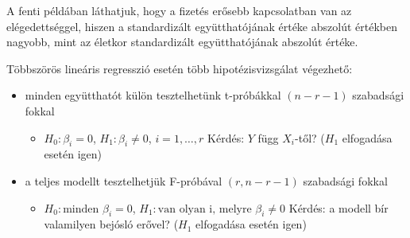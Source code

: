 \documentclass[
  letterpaper,
]{krantz}
\makeatletter
\newenvironment{Shaded}{\begin{snugshade}}{\end{snugshade}}
\newcommand{\AttributeTok}[1]{\textcolor[rgb]{0.40,0.45,0.13}{#1}}
\newcommand{\CommentTok}[1]{\textcolor[rgb]{0.37,0.37,0.37}{#1}}
\newcommand{\DecValTok}[1]{\textcolor[rgb]{0.68,0.00,0.00}{#1}}
\newcommand{\FunctionTok}[1]{\textcolor[rgb]{0.28,0.35,0.67}{#1}}
\newcommand{\NormalTok}[1]{\textcolor[rgb]{0.00,0.23,0.31}{#1}}
\newcommand{\SpecialCharTok}[1]{\textcolor[rgb]{0.37,0.37,0.37}{#1}}
\providecommand{\tightlist}{%
  \setlength{\itemsep}{0pt}\setlength{\parskip}{0pt}}\usepackage{longtable,booktabs,array}
\newenvironment{kframe}{%
\medskip{}
\setlength{\fboxsep}{.8em}
 \def\at@end@of@kframe{}%
 \ifinner\ifhmode%
  \def\at@end@of@kframe{\end{minipage}}%
  \begin{minipage}{\columnwidth}%
 \fi\fi%
 \def\FrameCommand##1{\hskip\@totalleftmargin \hskip-\fboxsep
 \colorbox{shadecolor}{##1}\hskip-\fboxsep
     \hskip-\linewidth \hskip-\@totalleftmargin \hskip\columnwidth}%
 \MakeFramed {\advance\hsize-\width
   \@totalleftmargin\z@ \linewidth\hsize
   \@setminipage}}%
 {\par\unskip\endMakeFramed%
 \at@end@of@kframe}
\renewenvironment{Shaded}{\begin{kframe}}{\end{kframe}}
\makeatother
\begin{document}
A fenti példában láthatjuk, hogy a fizetés erősebb kapcsolatban van az
elégedettséggel, hiszen a standardizált együtthatójának értéke abszolút
értékben nagyobb, mint az életkor standardizált együtthatójának abszolút
értéke.

Többszörös lineáris regresszió esetén több hipotézisvizsgálat végezhető:

\begin{itemize}
\tightlist
\item
  minden együtthatót külön tesztelhetünk t-próbákkal \((n-r-1)\)
  szabadsági fokkal

  \begin{itemize}
  \tightlist
  \item
    \(H_0:\beta_i=0\), \(H_1:\beta_i\neq0\), \(i=1,\dots,r\) Kérdés:
    \(Y\) függ \(X_i\)-től? (\(H_1\) elfogadása esetén igen)
  \end{itemize}
\item
  a teljes modellt tesztelhetjük F-próbával \((r,n-r-1)\) szabadsági
  fokkal

  \begin{itemize}
  \tightlist
  \item
    \(H_0: \text{minden } \beta_i=0\),
    \(H_1: \text{van olyan i, melyre } \beta_i\neq0\) Kérdés: a modell
    bír valamilyen bejósló erővel? (\(H_1\) elfogadása esetén igen)
  \end{itemize}
\end{itemize}

\begin{Shaded}
\end{Shaded}
\end{document}
